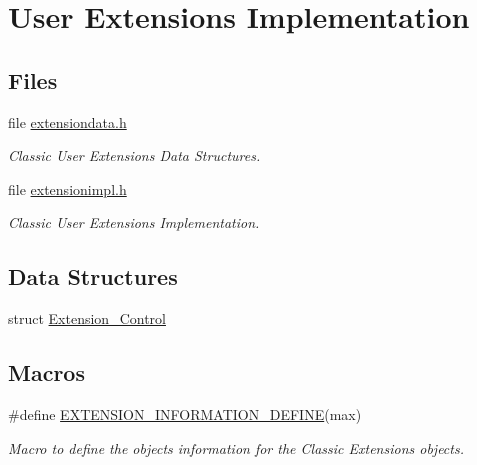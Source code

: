 \hypertarget{group__ClassicUserExtensionsImpl}{}\section{User Extensions Implementation}
\label{group__ClassicUserExtensionsImpl}
\subsection*{Files}
\begin{DoxyCompactItemize}
\item 
file \mbox{\hyperlink{extensiondata_8h}{extensiondata.\+h}}
\begin{DoxyCompactList}\small\item\em Classic User Extensions Data Structures. \end{DoxyCompactList}\item 
file \mbox{\hyperlink{extensionimpl_8h}{extensionimpl.\+h}}
\begin{DoxyCompactList}\small\item\em Classic User Extensions Implementation. \end{DoxyCompactList}\end{DoxyCompactItemize}
\subsection*{Data Structures}
\begin{DoxyCompactItemize}
\item 
struct \mbox{\hyperlink{structExtension__Control}{Extension\+\_\+\+Control}}
\end{DoxyCompactItemize}
\subsection*{Macros}
\begin{DoxyCompactItemize}
\item 
\#define \mbox{\hyperlink{group__ClassicUserExtensionsImpl_ga5225d89c7571da1bcf64c052bf0d4690}{E\+X\+T\+E\+N\+S\+I\+O\+N\+\_\+\+I\+N\+F\+O\+R\+M\+A\+T\+I\+O\+N\+\_\+\+D\+E\+F\+I\+NE}}(max)
\begin{DoxyCompactList}\small\item\em Macro to define the objects information for the Classic Extensions objects. \end{DoxyCompactList}\end{DoxyCompactItemize}
